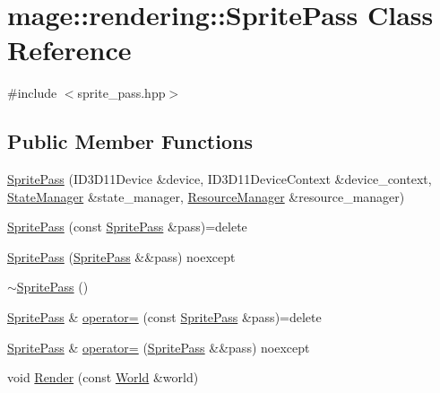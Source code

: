 \hypertarget{classmage_1_1rendering_1_1_sprite_pass}{}\section{mage\+:\+:rendering\+:\+:Sprite\+Pass Class Reference}
\label{classmage_1_1rendering_1_1_sprite_pass}


{\ttfamily \#include $<$sprite\+\_\+pass.\+hpp$>$}

\subsection*{Public Member Functions}
\begin{DoxyCompactItemize}
\item 
\hyperlink{classmage_1_1rendering_1_1_sprite_pass_ae247bfa4b2b13a874e080d53e271e974}{Sprite\+Pass} (I\+D3\+D11\+Device \&device, I\+D3\+D11\+Device\+Context \&device\+\_\+context, \hyperlink{classmage_1_1rendering_1_1_state_manager}{State\+Manager} \&state\+\_\+manager, \hyperlink{classmage_1_1rendering_1_1_resource_manager}{Resource\+Manager} \&resource\+\_\+manager)
\item 
\hyperlink{classmage_1_1rendering_1_1_sprite_pass_a9352291e5364fc157e4b2a1cd1184d8d}{Sprite\+Pass} (const \hyperlink{classmage_1_1rendering_1_1_sprite_pass}{Sprite\+Pass} \&pass)=delete
\item 
\hyperlink{classmage_1_1rendering_1_1_sprite_pass_ae8b938a091647c5540fa2ca8bf955556}{Sprite\+Pass} (\hyperlink{classmage_1_1rendering_1_1_sprite_pass}{Sprite\+Pass} \&\&pass) noexcept
\item 
\hyperlink{classmage_1_1rendering_1_1_sprite_pass_ac838dec1c351d3d4f0fdcc38ef98dc1f}{$\sim$\+Sprite\+Pass} ()
\item 
\hyperlink{classmage_1_1rendering_1_1_sprite_pass}{Sprite\+Pass} \& \hyperlink{classmage_1_1rendering_1_1_sprite_pass_a33cd3abf007bafb47d76524096e24eca}{operator=} (const \hyperlink{classmage_1_1rendering_1_1_sprite_pass}{Sprite\+Pass} \&pass)=delete
\item 
\hyperlink{classmage_1_1rendering_1_1_sprite_pass}{Sprite\+Pass} \& \hyperlink{classmage_1_1rendering_1_1_sprite_pass_a17566d8f281862629f095211bad18b9e}{operator=} (\hyperlink{classmage_1_1rendering_1_1_sprite_pass}{Sprite\+Pass} \&\&pass) noexcept
\item 
void \hyperlink{classmage_1_1rendering_1_1_sprite_pass_a9b4dbd8c8d0a8942976b6d0c0df7aa3d}{Render} (const \hyperlink{classmage_1_1rendering_1_1_world}{World} \&world)
\end{DoxyCompactItemize}
